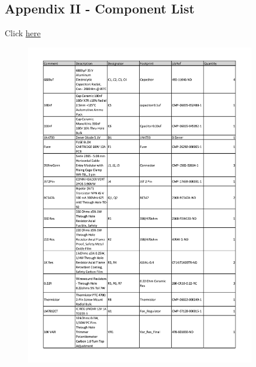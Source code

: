 \documentclass[11pt]{article}
\begin{document}
\subsection{Appendix II - Component List}
Click \textcolor{blue}{\hyperlink{page.9}{here}}
\label{sec:components}
\begin{figure}
    \centering
    \includegraphics[width=0.9\textwidth]{qq2.pdf}
\end{figure}
\end{document}
